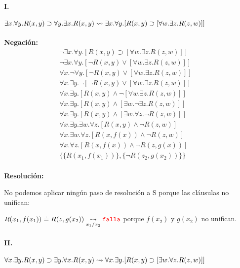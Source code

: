 \documentclass[10pt,a4paper]{article}
\begin{document}
\paragraph{I.} $\exists x. \forall y. R(x,y) \supset \forall y. \exists x. R(x,y) \underset{}{\overset{}{\leadsto}} \exists x.\forall y. [ R(x,y) \supset [\forall w.\exists z. R(z,w) ]]$
\begin{multicols}{2}
\textbf{Negación:}
\begin{align*}
\lnot\exists x. \forall y. [ R(x,y) \supset [\forall w. \exists z. R(z,w) ]] & \\[1pt]
\lnot\exists x. \forall y. [ \lnot R(x,y) \lor [\forall w. \exists z. R(z,w) ]] \\[1pt]
\forall x.\lnot \forall y. [ \lnot R(x,y) \lor [\forall w. \exists z. R(z,w) ]]  \\[1pt]
\forall x.\exists y. \lnot [ \lnot R(x,y) \lor [\forall w. \exists z. R(z,w) ]] \\[1pt]
\forall x.\exists y. [ R(x,y) \land \lnot[\forall w. \exists z. R(z,w) ]] \\[1pt]
\forall x.\exists y. [ R(x,y) \land [\exists w. \lnot\exists z. R(z,w) ]]  \\[1pt]
\forall x.\exists y. [ R(x,y) \land [\exists w. \forall z. \lnot R(z,w) ]] \\[1pt]
\forall x.\exists y. \exists w. \forall z. [ R(x,y) \land \lnot R(z,w) ] \\[1pt]
\forall x.\exists w. \forall z. [ R(x,f(x)) \land \lnot R(z,w) ]  \\[1pt]
\forall x.\forall z. [ R(x,f(x)) \land \lnot R(z,g(x)) ]  \\[1pt]
\{ \{R(x_1,f(x_1))\}, \{\lnot R(z_2,g(x_2))\} \}  \\[1pt]
\end{align*}

\noindent\textbf{Resolución:} 

No podemos aplicar ningún paso de resolución a S porque las cláusulas no unifican:

\noindent$R(x_1,f(x_1)) \doteq R(z,g(x_2)) \underset{x_1/x_2}{\overset{}{\leadsto}} {\color{red}\texttt{falla}}$ porque $f(x_2)$ y $g(x_2)$ no unifican.
\vfill\null
\end{multicols}
\paragraph{II.} $\forall x. \exists y. R(x,y) \supset \exists y. \forall x. R(x,y)  \underset{}{\overset{}{\leadsto}}  \forall x. \exists y. [R(x,y) \supset [\exists w. \forall z. R(z,w)]]$
\end{document}
